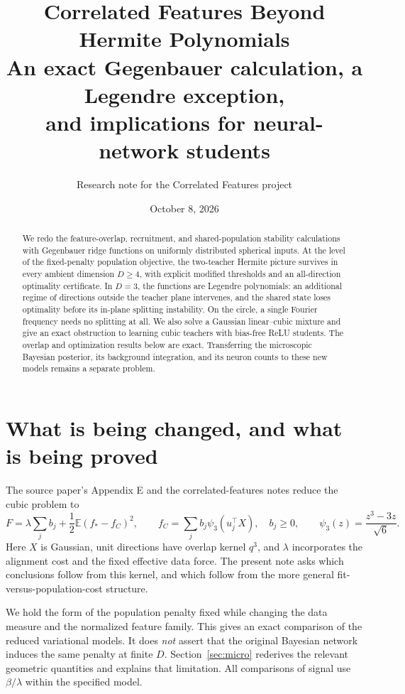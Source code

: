 \documentclass[11pt]{article}
\title{Correlated Features Beyond Hermite Polynomials\\ [totally AI slop, have not gone through in detail yet - Jeremy]
\large An exact Gegenbauer calculation, a Legendre exception,\\and implications for neural-network students}
\author{Research note for the Correlated Features project}
\date{October 8, 2026}
\newcommand{\E}{\mathbb E}
\theoremstyle{remark}
\begin{document}
\maketitle

\begin{abstract}
We redo the feature-overlap, recruitment, and shared-population stability
calculations with Gegenbauer ridge functions on uniformly distributed
spherical inputs. At the level of the fixed-penalty population objective,
the two-teacher Hermite picture survives in every ambient dimension
$D\geq4$, with explicit modified thresholds and an all-direction
optimality certificate. In $D=3$, the functions are Legendre polynomials:
an additional regime of directions outside the teacher plane intervenes,
and the shared state loses optimality before its in-plane splitting
instability. On the circle, a single Fourier frequency needs no splitting
at all. We also solve a Gaussian linear--cubic mixture and give an exact
obstruction to learning cubic teachers with bias-free ReLU students.
The overlap and optimization results below are exact. Transferring the
microscopic Bayesian posterior, its background integration, and its neuron
counts to these new models remains a separate problem.
\end{abstract}

\section{What is being changed, and what is being proved}

The source paper's Appendix E and the correlated-features notes reduce the
cubic problem to
\begin{equation}\label{eq:original}
 F=\lambda\sum_j b_j+\frac12\E(f_*-f_C)^2,
 \qquad f_C=\sum_j b_j\psi_3(u_j^\top X),\quad b_j\geq0,
 \qquad \psi_3(z)=\frac{z^3-3z}{\sqrt6}.
\end{equation}
Here $X$ is Gaussian, unit directions have overlap kernel $q^3$, and
$\lambda$ incorporates the alignment cost and the fixed effective data
force. The present note asks which conclusions follow from this kernel,
and which follow from the more general fit-versus-population-cost structure.

We hold the form of the population penalty fixed while changing the data
measure and the normalized feature family. This gives an exact comparison
of the reduced variational models. It does \emph{not} assert that the original
Bayesian network induces the same penalty at finite $D$. Section~\ref{sec:micro}
rederives the relevant geometric quantities and explains that limitation.
All comparisons of signal use $\beta/\lambda$ within the specified model.
\end{document}

